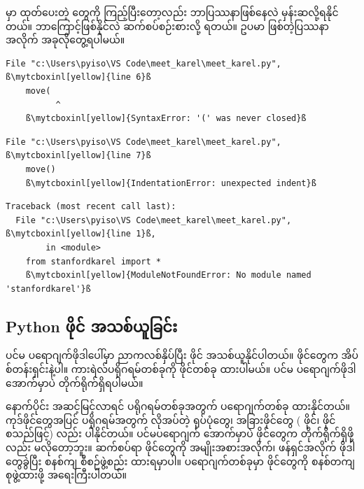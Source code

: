  မှာ ထုတ်ပေးတဲ့ တွေကို ကြည့်ပြီးတော့လည်း ဘာပြဿနာဖြစ်နေလဲ မှန်းဆလို့ရနိုင်တယ်။ ဘာကြောင့်ဖြစ်နိုင်လဲ ဆက်စပ်စဉ်းစားလို့ ရတယ်။ ဥပမာ ဖြစ်တဲ့ပြဿနာအလိုက် အခုလိုတွေ့ရပါမယ်။ 
%
\begin{verbatim}
File "c:\Users\pyiso\VS Code\meet_karel\meet_karel.py", ß\mytcboxinl[yellow]{line 6}ß
    move(
          ^
    ß\mytcboxinl[yellow]{SyntaxError: '(' was never closed}ß
\end{verbatim}
%
%
\begin{verbatim}
File "c:\Users\pyiso\VS Code\meet_karel\meet_karel.py", ß\mytcboxinl[yellow]{line 7}ß
    move()
    ß\mytcboxinl[yellow]{IndentationError: unexpected indent}ß 
\end{verbatim}
%
%
\begin{verbatim}
Traceback (most recent call last):
  File "c:\Users\pyiso\VS Code\meet_karel\meet_karel.py", ß\mytcboxinl[yellow]{line 1}ß, 
        in <module>
    from stanfordkarel import *
    ß\mytcboxinl[yellow]{ModuleNotFoundError: No module named 'stanfordkarel'}ß
\end{verbatim}
%
\clearpage

\subsection*{Python ဖိုင် အသစ်ယူခြင်း}
 ပင်မ ပရောဂျက်ဖိုဒါပေါ်မှာ ညာကလစ်နှိပ်ပြီး  ဖိုင် အသစ်ယူနိုင်ပါတယ်။  ဖိုင်တွေက  အိပ်စ်တန်းရှင်းနဲ့ပါ။ ကားရဲလ်ပရိုဂရမ်တစ်ခုကို  ဖိုင်တစ်ခု ထားပါမယ်။ ပင်မ ပရောဂျက်ဖိုဒါ အောက်မှာပဲ တိုက်ရိုက်ရှိရပါမယ်။ 

နောက်ပိုင်း အဆင့်မြင့်လာရင် ပရိုဂရမ်တစ်ခုအတွက် ပရောဂျက်တစ်ခု ထားနိုင်တယ်။ ကုဒ်ဖိုင်တွေအပြင် ပရိုဂရမ်အတွက် လိုအပ်တဲ့ ရုပ်ပုံတွေ၊ အခြားဖိုင်တွေ ( ဖိုင်၊  ဖိုင် စသည်ဖြင့်) လည်း ပါနိုင်တယ်။ ပင်မပရောဂျက် အောက်မှာပဲ  ဖိုင်တွေက တိုက်ရိုက်ရှိဖို့လည်း မလိုတော့ဘူး။  ဆက်{\allowbreak}စပ်ရာ ဖိုင်တွေကို အမျိုးအစားအလိုက်၊  ဖန်ရှင်အလိုက် ဖိုဒါတွေခွဲပြီး  စနစ်ကျ စီစဉ်ဖွဲ့စည်း ထားရမှာပါ။ ပရောဂျက်တစ်ခုမှာ ဖိုင်တွေကို စနစ်တကျ စုဖွဲ့ထားဖို့ အရေးကြီးပါတယ်။

